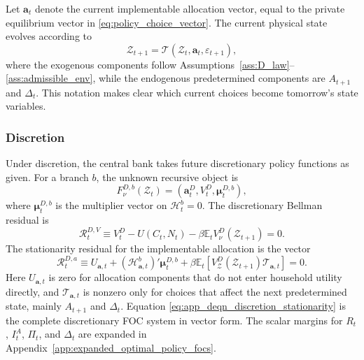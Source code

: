 ﻿\documentclass[12pt]{article}
\theoremstyle{remark}
\newcommand{\E}{\mathbb E}
\begin{document}
Let $\mathbf a_t$ denote the current implementable allocation vector, equal to the private
equilibrium vector in \eqref{eq:policy_choice_vector}. The current physical state evolves according
to
\begin{equation}
    \mathcal Z_{t+1}
    =
    \mathcal T(\mathcal Z_t,\mathbf a_t,\varepsilon_{t+1}),
    \label{eq:app_opt_state_transition}
\end{equation}
where the exogenous components follow Assumptions~\ref{ass:D_law}--\ref{ass:admissible_env}, while
the endogenous predetermined components are $A_{t+1}$ and $\Delta_t$. This notation makes clear
which current choices become tomorrow's state variables.

\subsubsection*{Discretion}

Under discretion, the central bank takes future discretionary policy functions as given. For a
branch $b$, the unknown recursive object is
\begin{equation}
    F_\nu^{D,b}(\mathcal Z_t)
    =
    \left(
        \mathbf a_t^D,
        V_t^D,
        \boldsymbol\mu_t^{D,b}
    \right),
    \label{eq:app_discretion_network_output}
\end{equation}
where $\boldsymbol\mu_t^{D,b}$ is the multiplier vector on $\mathcal H_t^b=0$. The discretionary
Bellman residual is
\begin{equation}
    \mathcal R_t^{D,V}
    \equiv
    V_t^D
    -
    U(C_t,N_t)
    -
    \beta
    \E_t
    V_\nu^D(\mathcal Z_{t+1})
    =
    0.
    \label{eq:app_deqn_discretion_bellman}
\end{equation}
The stationarity residual for the implementable allocation is the vector
\begin{equation}
    \mathcal R_t^{D,a}
    \equiv
    U_{\mathbf a,t}
    +
    \left(\mathcal H_{\mathbf a,t}^{b}\right)'
    \boldsymbol\mu_t^{D,b}
    +
    \beta
    \E_t
    \left[
        V_{\mathcal Z}^D(\mathcal Z_{t+1})
        \mathcal T_{\mathbf a,t}
    \right]
    =
    0.
    \label{eq:app_deqn_discretion_stationarity}
\end{equation}
Here $U_{\mathbf a,t}$ is zero for allocation components that do not enter household utility
directly, and $\mathcal T_{\mathbf a,t}$ is nonzero only for choices that affect the next
predetermined state, mainly $A_{t+1}$ and $\Delta_t$. Equation
\eqref{eq:app_deqn_discretion_stationarity} is the complete discretionary FOC system in vector
form. The scalar margins for $R_t$, $I_t^A$, $\Pi_t$, and $\Delta_t$ are expanded in
Appendix~\ref{app:expanded_optimal_policy_focs}.
\end{document}
